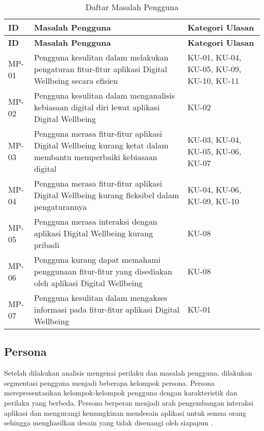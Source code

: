 \RaggedLeft
\begin{footnotesize}
\begin{longtable}[c]{|W{c}{0.07\textwidth}|>{\ccnormspacing}m{0.63\textwidth}|>{\ccnormspacingcenter}m{0.2\textwidth}|}
  \caption{Daftar Masalah Pengguna}
  \label{tab:daftar_masalah} \\
  \hline {}
  \textbf{ID} & \centering\textbf{Masalah Pengguna} & \textbf{Kategori Ulasan} \\ \hline \endfirsthead
  \hline {}
  \textbf{ID} & \centering\textbf{Masalah Pengguna} & \textbf{Kategori Ulasan} \\ \hline \endhead

  \hline \endfoot

  MP-01  & Pengguna kesulitan dalam melakukan pengaturan fitur-fitur aplikasi Digital Wellbeing secara efisien & KU-01, KU-04, KU-05, KU-09, KU-10, KU-11 \\ \hline
  MP-02  & Pengguna kesulitan dalam menganalisis kebiasaan digital diri lewat aplikasi Digital Wellbeing & KU-02 \\ \hline
  MP-03  & Pengguna merasa fitur-fitur aplikasi Digital Wellbeing kurang ketat dalam membantu memperbaiki kebiasaan digital & KU-03, KU-04, KU-05, KU-06, KU-07 \\ \hline
  MP-04  & Pengguna merasa fitur-fitur aplikasi Digital Wellbeing kurang fleksibel dalam pengaturannya & KU-04, KU-06, KU-09, KU-10 \\ \hline
  MP-05  & Pengguna merasa interaksi dengan aplikasi Digital Wellbeing kurang pribadi & KU-08 \\ \hline
  MP-06  & Pengguna kurang dapat memahami penggunaan fitur-fitur yang disediakan oleh aplikasi Digital Wellbeing & KU-08 \\ \hline
  MP-07  & Pengguna kesulitan dalam mengakses informasi pada fitur-fitur aplikasi Digital Wellbeing & KU-01 \\ \hline
\end{longtable}
\end{footnotesize}
\justifying
\FloatBarrier



\subsection{Persona}
\label{subsec:persona_pengguna}
Setelah dilakukan analisis mengenai perilaku dan masalah pengguna, dilakukan segmentasi pengguna menjadi beberapa kelompok persona. Persona merepresentasikan kelompok-kelompok pengguna dengan karakteristik dan perilaku yang berbeda. Persona berperan menjadi arah pengembangan interaksi aplikasi dan mengurangi kemungkinan mendesain aplikasi untuk semua orang sehingga menghasilkan desain yang tidak disenangi oleh siapapun \parencite{cooper2014face}.

